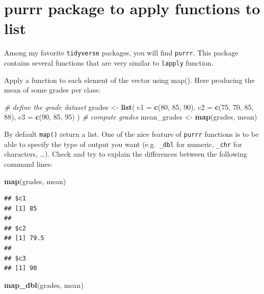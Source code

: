 \documentclass[
]{book}
\newenvironment{Shaded}{\begin{snugshade}}{\end{snugshade}}
\newcommand{\AttributeTok}[1]{\textcolor[rgb]{0.13,0.29,0.53}{#1}}
\newcommand{\CommentTok}[1]{\textcolor[rgb]{0.56,0.35,0.01}{\textit{#1}}}
\newcommand{\DecValTok}[1]{\textcolor[rgb]{0.00,0.00,0.81}{#1}}
\newcommand{\FunctionTok}[1]{\textcolor[rgb]{0.13,0.29,0.53}{\textbf{#1}}}
\newcommand{\NormalTok}[1]{#1}
\newcommand{\OtherTok}[1]{\textcolor[rgb]{0.56,0.35,0.01}{#1}}
\theoremstyle{definition}
\theoremstyle{definition}
\theoremstyle{definition}
\theoremstyle{definition}
\theoremstyle{remark}
\begin{document}
\section{purrr package to apply functions to list}\label{purrr-package-to-apply-functions-to-list}

Among my favorite \texttt{tidyverse} packages, you will find \texttt{purrr}. This package contains
several functions that are very similar to \texttt{lapply} function.

Apply a function to each element of the vector using map(). Here producing the mean of some grades per class:

\begin{Shaded}
\begin{Highlighting}[]
\CommentTok{\# define the grade dataset}
\NormalTok{grades }\OtherTok{\textless{}{-}}
  \FunctionTok{list}\NormalTok{(}
    \AttributeTok{c1 =} \FunctionTok{c}\NormalTok{(}\DecValTok{80}\NormalTok{, }\DecValTok{85}\NormalTok{, }\DecValTok{90}\NormalTok{),}
    \AttributeTok{c2 =} \FunctionTok{c}\NormalTok{(}\DecValTok{75}\NormalTok{, }\DecValTok{70}\NormalTok{, }\DecValTok{85}\NormalTok{, }\DecValTok{88}\NormalTok{),}
    \AttributeTok{c3 =} \FunctionTok{c}\NormalTok{(}\DecValTok{90}\NormalTok{, }\DecValTok{85}\NormalTok{, }\DecValTok{95}\NormalTok{)}
\NormalTok{  )}
\CommentTok{\# compute grades}
\NormalTok{mean\_grades }\OtherTok{\textless{}{-}} \FunctionTok{map}\NormalTok{(grades, mean)}
\end{Highlighting}
\end{Shaded}

By default \texttt{map()} return a list. One of the nice feature of \texttt{purrr} functions is to be able to specify the type of output you want (e.g.~\texttt{\_dbl} for numeric, \texttt{\_chr} for characters, \ldots).
Check and try to explain the differences between the following command lines:

\begin{Shaded}
\begin{Highlighting}[]
\FunctionTok{map}\NormalTok{(grades, mean)}
\end{Highlighting}
\end{Shaded}

\begin{verbatim}
## $c1
## [1] 85
## 
## $c2
## [1] 79.5
## 
## $c3
## [1] 90
\end{verbatim}

\begin{Shaded}
\begin{Highlighting}[]
\FunctionTok{map\_dbl}\NormalTok{(grades, mean)}
\end{Highlighting}
\end{Shaded}
\end{document}
